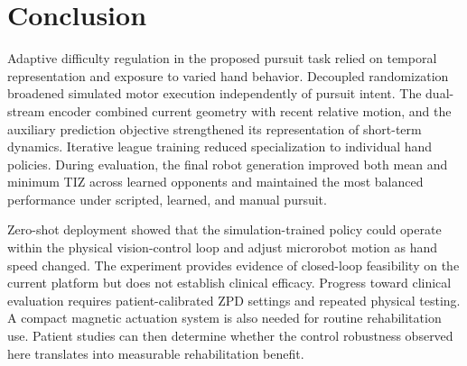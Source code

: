\documentclass[journal,twoside,web]{ieeecolor2}
\begin{document}
\section{Conclusion}
\label{sec:conclusion}
Adaptive difficulty regulation in the proposed pursuit task relied on temporal representation and exposure to varied hand behavior. Decoupled randomization broadened simulated motor execution independently of pursuit intent. The dual-stream encoder combined current geometry with recent relative motion, and the auxiliary prediction objective strengthened its representation of short-term dynamics. Iterative league training reduced specialization to individual hand policies. During evaluation, the final robot generation improved both mean and minimum TIZ across learned opponents and maintained the most balanced performance under scripted, learned, and manual pursuit.

Zero-shot deployment showed that the simulation-trained policy could operate within the physical vision-control loop and adjust microrobot motion as hand speed changed. The experiment provides evidence of closed-loop feasibility on the current platform but does not establish clinical efficacy. Progress toward clinical evaluation requires patient-calibrated ZPD settings and repeated physical testing. A compact magnetic actuation system is also needed for routine rehabilitation use. Patient studies can then determine whether the control robustness observed here translates into measurable rehabilitation benefit.

\balance


\end{document}
